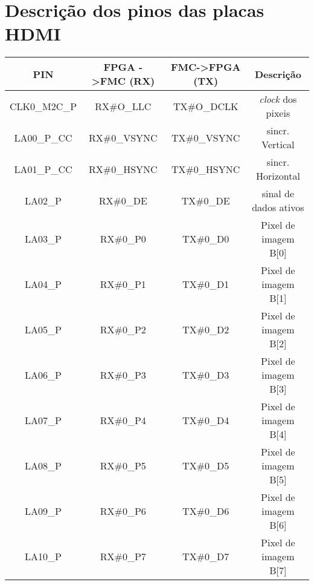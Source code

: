 \chapter{Descrição dos pinos das placas HDMI} \label{ap1:HDMI}
\begin{longtable}[h!]
	{|c|c|c|c|}
	\hline
	\centering
%		
		\textbf{PIN} & \textbf{FPGA -\textgreater FMC (RX)} & \textbf{FMC->FPGA (TX)} & \textbf{Descrição}       \\ \hline \endhead
		CLK0\_M2C\_P & RX\#O\_LLC                           & TX\#O\_DCLK                        & \textit{clock} dos pixeis         \\ \hline
		LA00\_P\_CC  & RX\#0\_VSYNC                         & TX\#0\_VSYNC                       & sincr. Vertical          \\ \hline
		LA01\_P\_CC  & RX\#0\_HSYNC                         & TX\#0\_HSYNC                       & sincr. Horizontal        \\ \hline
		LA02\_P      & RX\#0\_DE                            & TX\#0\_DE                          & sinal de dados ativos    \\ \hline
		LA03\_P      & RX\#0\_P0                            & TX\#0\_D0                          & Pixel de imagem B{[}0{]} \\ \hline
		LA04\_P      & RX\#0\_P1                            & TX\#0\_D1                          & Pixel de imagem B{[}1{]} \\ \hline
		LA05\_P      & RX\#0\_P2                            & TX\#0\_D2                          & Pixel de imagem B{[}2{]} \\ \hline
		LA06\_P      & RX\#0\_P3                            & TX\#0\_D3                          & Pixel de imagem B{[}3{]} \\ \hline
		LA07\_P      & RX\#0\_P4                            & TX\#0\_D4                          & Pixel de imagem B{[}4{]} \\ \hline
		LA08\_P      & RX\#0\_P5                            & TX\#0\_D5                          & Pixel de imagem B{[}5{]} \\ \hline
		LA09\_P      & RX\#0\_P6                            & TX\#0\_D6                          & Pixel de imagem B{[}6{]} \\ \hline
		LA10\_P      & RX\#0\_P7                            & TX\#0\_D7                          & Pixel de imagem B{[}7{]} \\ \hline

\end{longtable}
